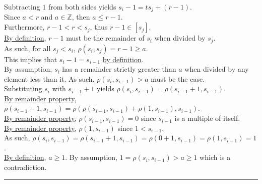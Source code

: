 \documentclass[a4paper,12pt]{article}
\begin{document}
\noindent Subtracting $1$ from both sides yields $s_i - 1 = ts_j + (r - 1)$.\\

\noindent Since $a < r$ and $a \in \mathbb{Z}$, then $a \leq r - 1$.\\

\noindent Furthermore, $r - 1 < r < s_j$, thus $r - 1 \in [s_j]$.\\

\noindent \hyperlink{theorem:remainder_theorem}{By definition}, $r - 1$ must be the remainder of $s_i$ when divided by $s_j$.\\

\noindent As such, for all $s_j < s_i$, $\rho(s_i, s_j) = r - 1 \geq a$.\\

\noindent This implies that $s_i - 1 = s_{i - 1}$ \hyperlink{definition:awkward_number_series}{by definition}.\\

\noindent By assumption, $s_i$ has a remainder strictly greater than $a$ when divided by any element less than it. As such, $\rho(s_i, s_{i - 1}) > a$ must be the case.\\

\noindent Substituting $s_i$ with $s_{i - 1} + 1$ yields $\rho(s_i, s_{i - 1}) = \rho(s_{i - 1} + 1, s_{i - 1})$.\\

\noindent \hyperlink{remainder_properties}{By remainder property}, $\rho(s_{i - 1} + 1, s_{i - 1}) = \rho(\rho(s_{i - 1}, s_{i - 1}) + \rho(1, s_{i - 1}), s_{i - 1})$.\\

\noindent \hyperlink{remainder_properties}{By remainder property}, $\rho(s_{i - 1}, s_{i - 1}) = 0$ since $s_{i - 1}$ is a multiple of itself.\\

\noindent \hyperlink{remainder_properties}{By remainder property}, $\rho(1, s_{i - 1})$ since $1 < s_{i - 1}$.\\

\noindent As such, $\rho(s_i, s_{i - 1}) = \rho(s_{i - 1} + 1, s_{i - 1}) = \rho(0 + 1, s_{i - 1}) = \rho(1, s_{i - 1}) = 1$.\\

\noindent \hyperlink{definition:awkward_number_series}{By definition}, $a \geq 1$. By assumption, $1 = \rho(s_i, s_{i - 1}) > a \geq 1$ which is a contradiction.


\begin{center}
\noindent\rule{8cm}{0.4pt}
\end{center}
\end{document}
